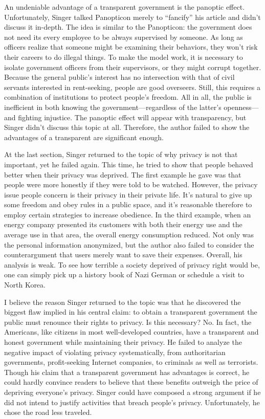 \documentclass{writing}
\begin{document}
An undeniable advantage of a transparent government is the panoptic
effect. Unfortunately, Singer talked Panopticon merely to ``fancify''
his article and didn't discuss it in-depth. The idea is similar to the
Panopticon: the government does not need its every employee to be always
supervised by someone. As long as officers realize that someone might be
examining their behaviors, they won't risk their careers to do illegal
things. To make the model work, it is necessary to isolate government
officers from their supervisors, or they might corrupt together. Because
the general public's interest has no intersection with that of civil
servants interested in rent-seeking, people are good overseers. Still,
this requires a combination of institutions to protect people's freedom.
All in all, the public is inefficient in both knowing the
government---regardless of the latter's openness---and fighting
injustice. The panoptic effect will appear with transparency, but Singer
didn't discuss this topic at all. Therefore, the author failed to show
the advantages of a transparent are significant enough.

At the last section, Singer returned to the topic of why privacy is not
that important, yet he failed again. This time, he tried to show that
people behaved better when their privacy was deprived. The first example
he gave was that people were more honestly if they were told to be
watched. However, the privacy issue people concern is their privacy in
their private life. It's natural to give up some freedom and obey rules
in a public space, and it's reasonable therefore to employ certain
strategies to increase obedience. In the third example, when an energy
company presented its customers with both their energy use and the
average use in that area, the overall energy consumption reduced. Not
only was the personal information anonymized, but the author also failed
to consider the counterargument that users merely want to save their
expenses. Overall, his analysis is weak. To see how terrible a society
deprived of privacy right would be, one can simply pick up a history
book of Nazi German or schedule a visit to North Korea.

I believe the reason Singer returned to the topic was that he discovered
the biggest flaw implied in his central claim: to obtain a transparent
government the public must renounce their rights to privacy. Is this
necessary? No. In fact, the Americans, like citizens in most
well-developed countries, have a transparent and honest government while
maintaining their privacy. He failed to analyze the negative impact of
violating privacy systematically, from authoritarian governments,
profit-seeking Internet companies, to criminals as well as terrorists.
Though his claim that a transparent government has advantages is
correct, he could hardly convince readers to believe that these benefits
outweigh the price of depriving everyone's privacy. Singer could have
composed a strong argument if he did not intend to justify activities
that breach people's privacy. Unfortunately, he chose the road less
traveled.
\end{document}
